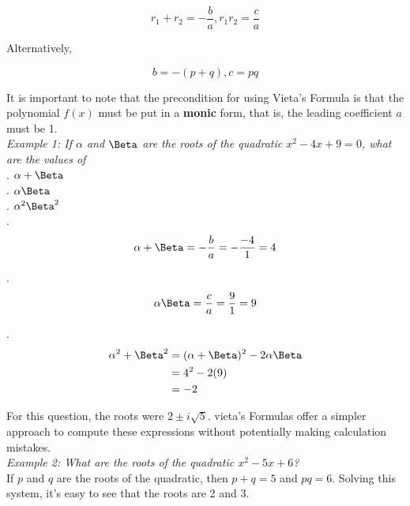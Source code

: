 \documentclass{article}
\begin{document}
    \begin{equation*}
        r_1 + r_2 = -\frac{b}{a}, r_1 r_2 = \frac{c}{a}
    \end{equation*}

    \noindent Alternatively,

    \begin{equation*}
        b=-(p+q),c=pq
    \end{equation*}

    \noindent It is important to note that the precondition for using Vieta's Formula is that
    the polynomial $f(x)$ must be put in a \textbf{monic} form, that is, the leading coefficient
    $a$ must be 1. \\

    \noindent \color{blue} \textit{Example 1: If $\alpha$ and $\Beta$ are the roots of the
    quadratic $x^2-4x+9=0$, what are the values of} \\
    . $\alpha+\Beta$ \\
    . $\alpha\Beta$ \\
    . $\alpha^2\Beta^2$ \color{black} \\

    .
    \begin{equation*}
        \alpha + \Beta = -\frac{b}{a} = -\frac{-4}{1} = 4
    \end{equation*}

    .
    \begin{equation*}
        \alpha\Beta = \frac{c}{a} = \frac{9}{1} = 9
    \end{equation*}

    .
    \begin{align*}
        \alpha^2+\Beta^2 &= (\alpha + \Beta)^2 - 2\alpha\Beta \\
        &= 4^2 - 2(9) \\
        &= -2
    \end{align*}

    \noindent For this question, the roots were $2\pm i\sqrt{5}$. vieta's Formulas offer a
    simpler approach to compute these expressions without potentially making calculation
    mistakes. \\

    \noindent \color{blue} \textit{Example 2: What are the roots of the quadratic $x^2-5x+6$?} \color{black} \\
    \noindent If $p$ and $q$ are the roots of the quadratic, then $p+q=5$ and $pq=6$. Solving
    this system, it's easy to see that the roots are 2 and 3. \\
\end{document}
